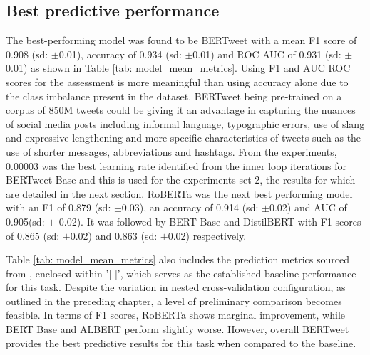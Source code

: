 \subsection{Best predictive performance}
The best-performing model was found to be BERTweet with a mean F1 score of 0.908 (sd: $\pm$0.01), accuracy of 0.934 (sd: $\pm$0.01) and ROC AUC of 0.931 (sd: $\pm$0.01) as shown in Table \ref{tab: model_mean_metrics}. Using F1 and AUC ROC scores for the assessment is more meaningful than using accuracy alone due to the class imbalance present in the dataset. BERTweet being pre-trained on a corpus of 850M tweets could be giving it an advantage in capturing the nuances of social media posts including informal language, typographic errors, use of slang and expressive lengthening and more specific characteristics of tweets such as the use of shorter messages, abbreviations and hashtags. From the experiments, 0.00003 was the best learning rate identified from the inner loop iterations for BERTweet Base and this is used for the experiments set 2, the results for which are detailed in the next section. RoBERTa was the next best performing model with an F1 of 0.879 (sd: $\pm$0.03), an accuracy of 0.914 (sd: $\pm$0.02) and AUC of 0.905(sd: $\pm$ 0.02). It was followed by BERT Base and DistilBERT with F1 scores of 0.865 (sd: $\pm$0.02) and 0.863 (sd: $\pm$0.02) respectively.

Table \ref{tab: model_mean_metrics} also includes the prediction metrics sourced from \cite{jin_complaint_2020}, enclosed within '[ ]', which serves as the established baseline performance for this task. Despite the variation in nested cross-validation configuration, as outlined in the preceding chapter, a level of preliminary comparison becomes feasible. In terms of F1 scores, RoBERTa shows marginal improvement, while BERT Base and ALBERT perform slightly worse. However, overall BERTweet provides the best predictive results for this task when compared to the baseline.\\

